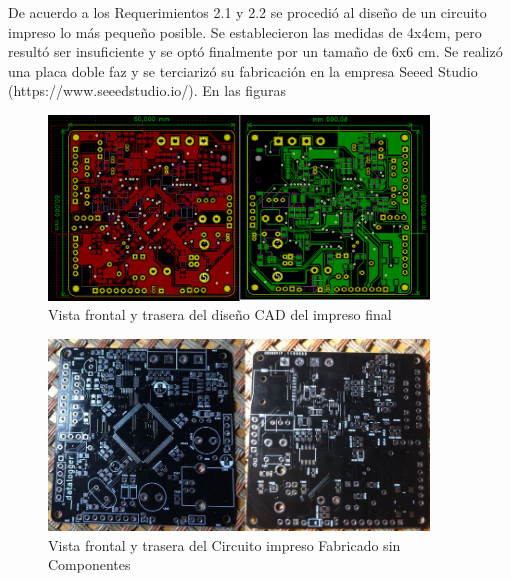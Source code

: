 De acuerdo a los Requerimientos 2.1 y 2.2 se procedió al diseño de un circuito impreso lo más pequeño posible. Se establecieron las medidas de 4x4cm, pero resultó ser insuficiente y se optó finalmente por un tamaño de 6x6 cm. Se realizó una placa doble faz y se terciarizó su fabricación en la empresa Seeed Studio (https://www.seeedstudio.io/). En las figuras 

\begin{figure}[!htbp]
	\centering	
	\includegraphics[width=0.9\textwidth]{./Figures/pcbFinal.png}			
	\caption{Vista frontal y trasera del diseño CAD del impreso final}
	\label{fig:pcbFinal}
\end{figure}


\begin{figure}[!htbp]
	\centering	
	\includegraphics[width=0.9\textwidth]{./Figures/pcbFinalSinComponentes.png}			
	\caption{Vista frontal y trasera del Circuito impreso Fabricado sin Componentes}
	\label{fig:pcbFinalSinComponentes}
\end{figure}